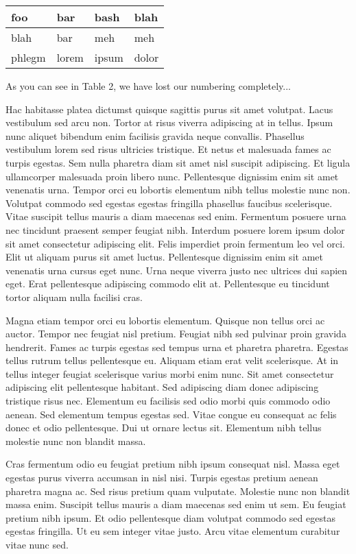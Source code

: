 \documentclass{article}
\begin{document}
\vspace{0.5cm}

\begin{tabular}{|l|l|l|l|}
\hline
foo & bar & bash & blah \\
\hline
blah & bar & meh & meh \\
\hline
phlegm & lorem & ipsum & dolor \\
\hline
\end{tabular}

\vspace{0.5cm}

As you can see in Table 2, we have lost our numbering completely...

Hac habitasse platea dictumst quisque sagittis purus sit amet volutpat. Lacus vestibulum sed arcu non. Tortor at risus viverra adipiscing at in tellus. Ipsum nunc aliquet bibendum enim facilisis gravida neque convallis. Phasellus vestibulum lorem sed risus ultricies tristique. Et netus et malesuada fames ac turpis egestas. Sem nulla pharetra diam sit amet nisl suscipit adipiscing. Et ligula ullamcorper malesuada proin libero nunc. Pellentesque dignissim enim sit amet venenatis urna. Tempor orci eu lobortis elementum nibh tellus molestie nunc non. Volutpat commodo sed egestas egestas fringilla phasellus faucibus scelerisque. Vitae suscipit tellus mauris a diam maecenas sed enim. Fermentum posuere urna nec tincidunt praesent semper feugiat nibh. Interdum posuere lorem ipsum dolor sit amet consectetur adipiscing elit. Felis imperdiet proin fermentum leo vel orci. Elit ut aliquam purus sit amet luctus. Pellentesque dignissim enim sit amet venenatis urna cursus eget nunc. Urna neque viverra justo nec ultrices dui sapien eget. Erat pellentesque adipiscing commodo elit at. Pellentesque eu tincidunt tortor aliquam nulla facilisi cras.

Magna etiam tempor orci eu lobortis elementum. Quisque non tellus orci ac auctor. Tempor nec feugiat nisl pretium. Feugiat nibh sed pulvinar proin gravida hendrerit. Fames ac turpis egestas sed tempus urna et pharetra pharetra. Egestas tellus rutrum tellus pellentesque eu. Aliquam etiam erat velit scelerisque. At in tellus integer feugiat scelerisque varius morbi enim nunc. Sit amet consectetur adipiscing elit pellentesque habitant. Sed adipiscing diam donec adipiscing tristique risus nec. Elementum eu facilisis sed odio morbi quis commodo odio aenean. Sed elementum tempus egestas sed. Vitae congue eu consequat ac felis donec et odio pellentesque. Dui ut ornare lectus sit. Elementum nibh tellus molestie nunc non blandit massa.

Cras fermentum odio eu feugiat pretium nibh ipsum consequat nisl. Massa eget egestas purus viverra accumsan in nisl nisi. Turpis egestas pretium aenean pharetra magna ac. Sed risus pretium quam vulputate. Molestie nunc non blandit massa enim. Suscipit tellus mauris a diam maecenas sed enim ut sem. Eu feugiat pretium nibh ipsum. Et odio pellentesque diam volutpat commodo sed egestas egestas fringilla. Ut eu sem integer vitae justo. Arcu vitae elementum curabitur vitae nunc sed.
\end{document}
